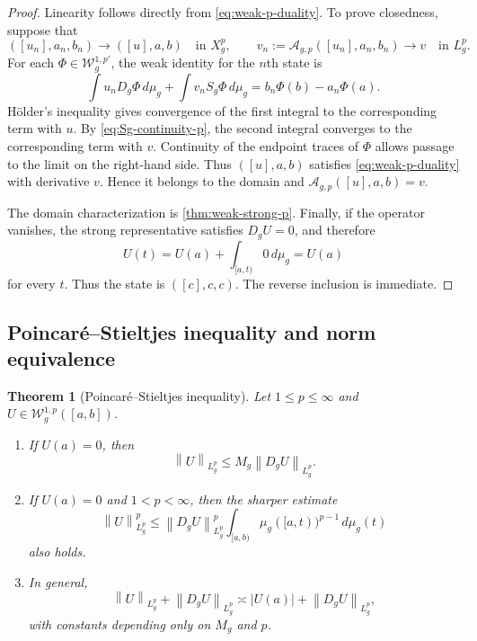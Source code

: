 \documentclass[preprint,12pt]{elsarticle}
\newcommand{\finalrev}[1]{{\color{red}#1}}
\newcommand{\finalrev}[1]{#1}
\newtheorem{theorem}{Theorem}[section]
\theoremstyle{definition}
\theoremstyle{remark}
\newcommand{\norm}[1]{\left\lVert#1\right\rVert}
\newcommand{\abs}[1]{\left\lvert#1\right\rvert}
\begin{document}
\begin{proof}
Linearity follows directly from \eqref{eq:weak-p-duality}. To prove closedness, suppose that
\[
 ([u_n],a_n,b_n)\to([u],a,b)\quad\text{in }X_g^p,
 \qquad
 v_n:=\mathcal A_{g,p}([u_n],a_n,b_n)\to v\quad\text{in }L_g^p.
\]
For each $\Phi\in\mathcal W_g^{1,p'}$, the weak identity for the $n$th state is
\[
 \int u_nD_g\Phi\,d\mu_g+\int v_nS_g\Phi\,d\mu_g
 =b_n\Phi(b)-a_n\Phi(a).
\]
H\"older's inequality gives convergence of the first integral to the corresponding term with $u$. By \eqref{eq:Sg-continuity-p}, the second integral converges to the corresponding term with $v$. Continuity of the endpoint traces of $\Phi$ allows passage to the limit on the right-hand side. Thus $([u],a,b)$ satisfies \eqref{eq:weak-p-duality} with derivative $v$. Hence it belongs to the domain and $\mathcal A_{g,p}([u],a,b)=v$.

The domain characterization is \cref{thm:weak-strong-p}. Finally, if the operator vanishes, the strong representative satisfies $D_gU=0$, and therefore
\[
 U(t)=U(a)+\int_{[a,t)}0\,d\mu_g=U(a)
\]
for every $t$. Thus the state is $([c],c,c)$. The reverse inclusion is immediate.
\end{proof}

\subsection{Poincar\'e--Stieltjes inequality and norm equivalence}

\begin{theorem}[Poincar\'e--Stieltjes inequality]\label{thm:poincare}
Let $1\le p\le\infty$ and $U\in\mathcal W_g^{1,p}([a,b])$.
\begin{enumerate}[label=\roman*)]
 \item If $U(a)=0$, then
 \begin{equation}\label{eq:poincare-simple}
  \norm{U}_{L_g^p}\le M_g\norm{D_gU}_{L_g^p}.
 \end{equation}
 \item \finalrev{If $U(a)=0$ and $1<p<\infty$, then the sharper estimate}
 \begin{equation}\label{eq:poincare-refined}
  \norm{U}_{L_g^p}^p
  \le \norm{D_gU}_{L_g^p}^p
  \int_{[a,b)}\mu_g([a,t))^{p-1}\,d\mu_g(t)
 \end{equation}
 also holds.
 \item In general,
 \begin{equation}\label{eq:trace-norm-equivalence}
  \norm{U}_{L_g^p}+\norm{D_gU}_{L_g^p}
  \asymp
  \abs{U(a)}+\norm{D_gU}_{L_g^p},
 \end{equation}
 with constants depending only on $M_g$ and $p$.
\end{enumerate}
\end{theorem}
\end{document}
